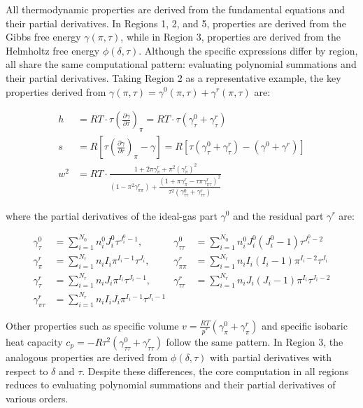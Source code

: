 \documentclass{article}
\begin{document}
All thermodynamic properties are derived from the fundamental equations and their partial derivatives. In Regions 1, 2, and 5, properties are derived from the Gibbs free energy $\gamma(\pi,\tau)$, while in Region 3, properties are derived from the Helmholtz free energy $\phi(\delta,\tau)$. Although the specific expressions differ by region, all share the same computational pattern: evaluating polynomial summations and their partial derivatives. Taking Region 2 as a representative example, the key properties derived from $\gamma(\pi,\tau) = \gamma^0(\pi,\tau) + \gamma^r(\pi,\tau)$ are:

\begin{align}
h &= RT \cdot \tau \left( \frac{\partial \gamma}{\partial \tau} \right)_\pi
    = RT \cdot \tau \left( \gamma^0_\tau + \gamma^r_\tau \right) \\
s &= R \left[ \tau \left( \frac{\partial \gamma}{\partial \tau} \right)_\pi - \gamma \right]
    = R \left[ \tau \left( \gamma^0_\tau + \gamma^r_\tau \right) - \left( \gamma^0 + \gamma^r \right) \right] \label{eq:entropy} \\
w^2 &= RT \cdot \frac{1 + 2\pi\gamma^r_\pi + \pi^2(\gamma^r_\pi)^2}{\left( 1 - \pi^2\gamma^r_{\pi\pi} \right) + \dfrac{\left( 1 + \pi\gamma^r_\pi - \tau\pi\gamma^r_{\pi\tau} \right)^2}{\tau^2\left( \gamma^0_{\tau\tau} + \gamma^r_{\tau\tau} \right)}} \label{eq:speed}
\end{align}

where the partial derivatives of the ideal-gas part $\gamma^0$ and the residual part $\gamma^r$ are:

\begin{align}
\gamma^0_\tau &= \sum_{i=1}^{N_0} n_i^0 J_i^0 \tau^{J_i^0 - 1}, &
\gamma^0_{\tau\tau} &= \sum_{i=1}^{N_0} n_i^0 J_i^0 (J_i^0 - 1) \tau^{J_i^0 - 2} \\
\gamma^r_\pi &= \sum_{i=1}^{N_r} n_i I_i \pi^{I_i - 1} \tau^{J_i}, &
\gamma^r_{\pi\pi} &= \sum_{i=1}^{N_r} n_i I_i (I_i - 1) \pi^{I_i - 2} \tau^{J_i} \\
\gamma^r_\tau &= \sum_{i=1}^{N_r} n_i J_i \pi^{I_i} \tau^{J_i - 1}, &
\gamma^r_{\tau\tau} &= \sum_{i=1}^{N_r} n_i J_i (J_i - 1) \pi^{I_i} \tau^{J_i - 2} \\
\gamma^r_{\pi\tau} &= \sum_{i=1}^{N_r} n_i I_i J_i \pi^{I_i - 1} \tau^{J_i - 1}
\end{align}

Other properties such as specific volume $v = \frac{RT}{p^*}(\gamma^0_\pi + \gamma^r_\pi)$ and specific isobaric heat capacity $c_p = -R\tau^2(\gamma^0_{\tau\tau} + \gamma^r_{\tau\tau})$ follow the same pattern. In Region 3, the analogous properties are derived from $\phi(\delta,\tau)$ with partial derivatives with respect to $\delta$ and $\tau$. Despite these differences, the core computation in all regions reduces to evaluating polynomial summations and their partial derivatives of various orders.
\end{document}
